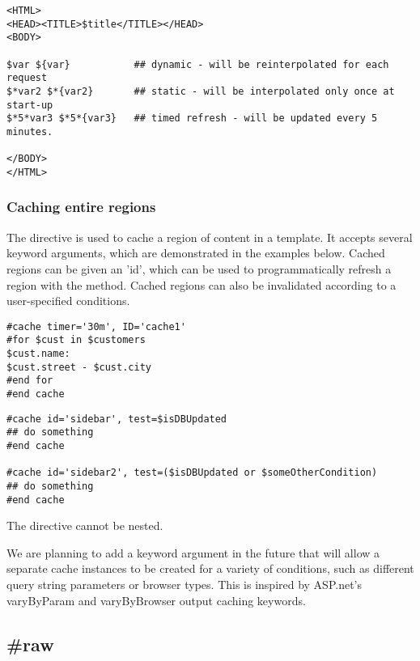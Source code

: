 \begin{verbatim}
<HTML>
<HEAD><TITLE>$title</TITLE></HEAD>
<BODY>

$var ${var}           ## dynamic - will be reinterpolated for each request
$*var2 $*{var2}       ## static - will be interpolated only once at start-up
$*5*var3 $*5*{var3}   ## timed refresh - will be updated every 5 minutes.

</BODY>
</HTML>
\end{verbatim}

\subsubsection{Caching entire regions}
\label{output.caching.regions}

The  directive is used to cache a region of content in a template.
It accepts several keyword arguments, which are demonstrated in the examples
below.  Cached regions can be given an 'id', which can be used to
programmatically refresh a region with the 
method.  Cached regions can also be invalidated according to a user-specified
 conditions.

\begin{verbatim}
#cache timer='30m', ID='cache1'
#for $cust in $customers
$cust.name:
$cust.street - $cust.city
#end for
#end cache
\end{verbatim}

\begin{verbatim}
#cache id='sidebar', test=$isDBUpdated
## do something
#end cache

#cache id='sidebar2', test=($isDBUpdated or $someOtherCondition)
## do something
#end cache
\end{verbatim}

The  directive cannot be nested.

We are planning to add a  keyword argument in the future that
will allow a separate cache instances to be created for a variety of conditions,
such as different query string parameters or browser types. This is inspired by
ASP.net's varyByParam and varyByBrowser output caching keywords.


\subsection{\#raw}
\label{output.raw}

